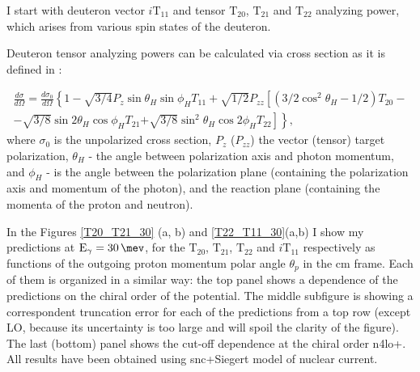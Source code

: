     I start with deuteron vector $i\text{T}_{11}$ and tensor $\text{T}_{20}$, $\text{T}_{21}$ and $\text{T}_{22}$
    analyzing power, which arises from various spin states of the deuteron.
    
    Deuteron tensor analyzing powers can be calculated via cross section as it is defined in \cite{rachek2007}:
    
    \begin{eqnarray}
            \frac{d \sigma}{d \Omega}= \frac{d \sigma_0}{d \Omega}\left\{1-\sqrt{3 / 4} P_z \sin \theta_H \sin \phi_H T_{11}\right.
            +\sqrt{1 / 2} P_{z z}\left[\left(3 / 2 \cos ^2 \theta_H-1 / 2\right) T_{20}\right. - \nonumber \\
            -\sqrt{3 / 8} \sin 2 \theta_H \cos \phi_H T_{21} 
            \left.\left.+\sqrt{3 / 8} \sin ^2 \theta_H \cos 2 \phi_H T_{22}\right]\right\},
    \end{eqnarray}
    where $\sigma_0$ is the unpolarized cross section, $P_z$ ($P_{zz}$)
    the vector (tensor) target polarization, $\theta_H$ - the angle
    between polarization axis and photon momentum,
    and $\phi_H$ - is the angle between the polarization plane 
    (containing the polarization axis and momentum of the photon),
    and the reaction plane (containing the momenta of the proton
    and neutron).

    In the Figures \ref{T20_T21_30} (a, b) and \ref{T22_T11_30}(a,b)
    I show my predictions at $\text{E}_\gamma = \SI{30}{\mev}$, for the
    $\text{T}_{20}$, $\text{T}_{21}$, $\text{T}_{22}$  and $i\text{T}_{11}$ respectively as functions 
    of the outgoing proton momentum polar angle $\theta_p$ in the \gls{cm} frame. Each of them
    is organized in a similar way: the top
    panel shows a dependence of the predictions on the 
    chiral order of the potential. The middle subfigure is
    showing a correspondent truncation error for each of the 
    predictions from a top row (except LO, because its uncertainty is
    too large and will spoil the clarity of the figure). The last (bottom)
    panel shows the cut-off dependence at the chiral
    order \gls{n4lo+}. 
    All results have been obtained using \gls{snc}+Siegert model of nuclear current.

